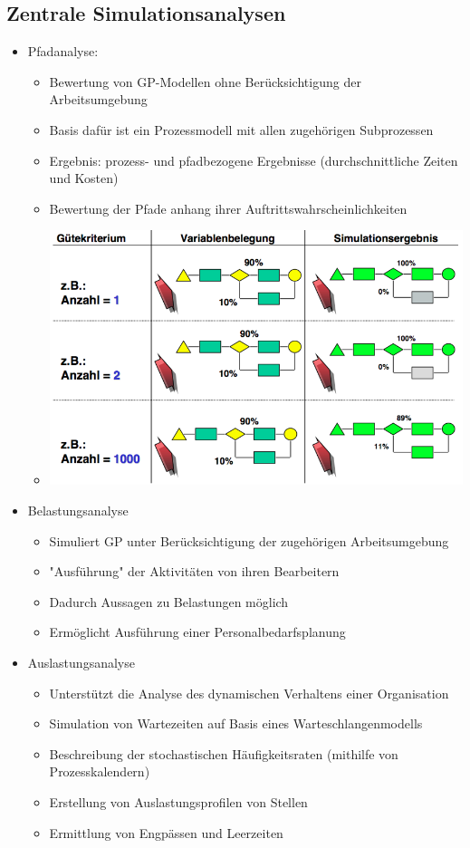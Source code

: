 \documentclass[11pt,a4paper]{article}
\begin{document}
\subsection{Zentrale Simulationsanalysen}
\begin{itemize}
\item Pfadanalyse:
	\begin{itemize}
	\item Bewertung von GP-Modellen ohne Berücksichtigung der Arbeitsumgebung
	\item Basis dafür ist ein Prozessmodell mit allen zugehörigen Subprozessen
	\item Ergebnis: prozess- und pfadbezogene Ergebnisse (durchschnittliche Zeiten und Kosten)
	\item Bewertung der Pfade anhang ihrer Auftrittswahrscheinlichkeiten
	\item[] \includegraphics[width=15cm]{Bilder/pfadstat}
	\end{itemize}

\item Belastungsanalyse
	\begin{itemize}
	\item Simuliert GP unter Berücksichtigung der zugehörigen Arbeitsumgebung
	\item "Ausführung" der Aktivitäten von ihren Bearbeitern
	\item Dadurch Aussagen zu Belastungen möglich
	\item Ermöglicht Ausführung einer Personalbedarfsplanung
	\end{itemize}

\item Auslastungsanalyse
	\begin{itemize}
	\item Unterstützt die Analyse des dynamischen Verhaltens einer Organisation
	\item Simulation von Wartezeiten auf Basis eines Warteschlangenmodells
	\item Beschreibung der stochastischen Häufigkeitsraten (mithilfe von Prozesskalendern)
	\item Erstellung von Auslastungsprofilen von Stellen
	\item Ermittlung von Engpässen und Leerzeiten
	\end{itemize}


\end{itemize}
\end{document}
